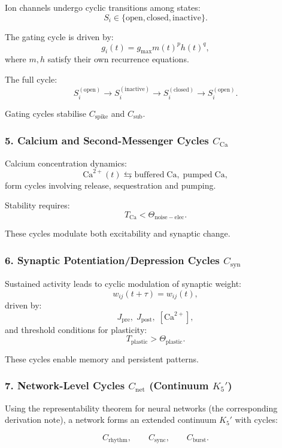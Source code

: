 Ion channels undergo cyclic transitions among states:
\[
  S_i \in \{\mathrm{open}, \mathrm{closed}, \mathrm{inactive}\}.
\]

The gating cycle is driven by:
\[
  g_i(t) = g_{\mathrm{max}} m(t)^p h(t)^q,
\]
where $m,h$ satisfy their own recurrence equations.

The full cycle:
\[
  S_i^{(\mathrm{open})}
  \to
  S_i^{(\mathrm{inactive})}
  \to
  S_i^{(\mathrm{closed})}
  \to
  S_i^{(\mathrm{open})}.
\]

Gating cycles stabilise $C_{\mathrm{spike}}$ and $C_{\mathrm{sub}}$.

\subsubsection{5. Calcium and Second-Messenger Cycles $C_{\mathrm{Ca}}$}

Calcium concentration dynamics:
\[
  \mathrm{Ca}^{2+}(t)
  \leftrightarrows
  \mathrm{buffered\; Ca},\;
  \mathrm{pumped\; Ca},
\]
form cycles involving release, sequestration and pumping.

Stability requires:
\[
  T_{\mathrm{Ca}} < \Theta_{\mathrm{noise-elec}}.
\]

These cycles modulate both excitability and synaptic change.

\subsubsection{6. Synaptic Potentiation/Depression Cycles $C_{\mathrm{syn}}$}

Sustained activity leads to cyclic modulation of synaptic weight:
\[
  w_{ij}(t+\tau) = w_{ij}(t),
\]
driven by:
\[
  J_{\mathrm{pre}},\; J_{\mathrm{post}},\; [\mathrm{Ca}^{2+}],
\]
and threshold conditions for plasticity:
\[
  T_{\mathrm{plastic}} > \Theta_{\mathrm{plastic}}.
\]

These cycles enable memory and persistent patterns.

\subsubsection{7. Network-Level Cycles $C_{\mathrm{net}}$ (Continuum $K_5'$)}

Using the representability theorem for neural networks (the corresponding derivation note),
a network forms an extended continuum $K_5'$ with cycles:

\[
  C_{\mathrm{rhythm}},
  \qquad
  C_{\mathrm{sync}},
  \qquad
  C_{\mathrm{burst}}.
\]

